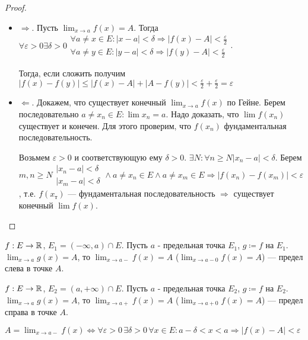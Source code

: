 \begin{proof}
    \slashn
    \begin{itemize}
        \item $\Rightarrow$. Пусть  $\lim_{x\to a} f(x) = A$. Тогда $\forall \varepsilon > 0 \exists \delta > 0 \begin{array}{l} \forall a \neq x \in E: |x-a| < \delta \Rightarrow |f(x) - A| < \frac{\varepsilon}{2} \\ \forall a \neq y \in E: |y-a| < \delta \Rightarrow |f(y) - A| < \frac{\varepsilon}{2} \end{array}$. 

            Тогда, если сложить получим $|f(x) - f(y)| \le |f(x) - A| + |A - f(y)| < \frac{\varepsilon}{2} + \frac{\varepsilon}{2} = \varepsilon$
        \item $\Leftarrow$. Докажем, что существует конечный  $\lim_{x \to a} f(x)$ по Гейне. Берем последовательно  $a \neq x_n \in E: \lim x_n = a$. Надо доказать, что $\lim f(x_n)$ существует и конечен. Для этого проверим, что $f(x_n)$ фундаментальная последовательность.

            Возьмем $\varepsilon > 0$ и соответствующую ему $\delta > 0$.  $\exists N: \forall n \ge N |x_n - a| < \delta$. Берем $m, n \ge N \begin{array}{l} |x_n - a| < \delta \\ |x_m- a| < \delta \end{array} \land a \neq x_n \in E \land a \neq x_m \in E \Rightarrow |f(x_n) - f(x_m)| < \varepsilon$, т.е. $f(x_т)$ --- фундаментальная последовательность  $\Rightarrow$ существует конечный  $\lim f(x)$.
    \end{itemize}
\end{proof}
\begin{definition}
    $f: E \to \mathbb{R}$,  $E_1 = (-\infty, a) \cap E$. Пусть  $a$ - предельная точка  $E_1$,  $g \coloneqq f$ на  $E_1$.  $\lim_{x\to a} g(x) = A$, то  $\lim_{x \to a-} f(x)= A$ ($\lim_{x \to a-0} f(x) = A$) --- предел слева в точке $A$.
\end{definition}
\begin{definition}
    $f: E \to \mathbb{R}$,  $E_2 = (a, +\infty) \cap E$. Пусть  $a$ - предельная точка  $E_2$,  $g \coloneqq f$ на  $E_2$.  $\lim_{x\to a} g(x) = A$, то  $\lim_{x \to a+} f(x)= A$ ($\lim_{x \to a+0} f(x) = A$) --- предел справа в точке $A$.
\end{definition}
\begin{remark}
    $A = \lim_{x \to a-} f(x) \iff \forall \varepsilon > 0 \, \exists \delta > 0 \, \forall x \in E: a-\delta < x < a \Rightarrow |f(x) - A| < \varepsilon$
\end{remark}
